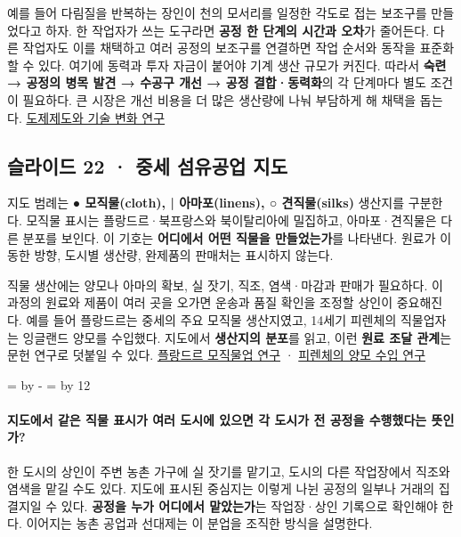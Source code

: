 \documentclass[10pt,a4paper]{article}
\newcommand{\ReserveQuestionSpace}{%
  \par\begingroup
  \dimen0=\pagegoal \advance\dimen0 by -\pagetotal
  \dimen2=\baselineskip \multiply\dimen2 by 12
  \ifdim\dimen0<\dimen2 \newpage\fi
  \endgroup}
\begin{document}
예를 들어 다림질을 반복하는 장인이 천의 모서리를 일정한 각도로 접는 보조구를 만들었다고 하자. 한 작업자가 쓰는 도구라면 \textbf{공정 한 단계의 시간과 오차}가 줄어든다. 다른 작업자도 이를 채택하고 여러 공정의 보조구를 연결하면 작업 순서와 동작을 표준화할 수 있다. 여기에 동력과 투자 자금이 붙어야 기계 생산 규모가 커진다. 따라서 \textbf{숙련 → 공정의 병목 발견 → 수공구 개선 → 공정 결합·동력화}의 각 단계마다 별도 조건이 필요하다. 큰 시장은 개선 비용을 더 많은 생산량에 나눠 부담하게 해 채택을 돕는다. \href{https://www.cambridge.org/core/journals/journal-of-economic-history/article/abs/craft-guilds-apprenticeship-and-technological-change-in-preindustrial-europe/4B18A7808BACBFA40D76475FBCB665E0}{도제제도와 기술 변화 연구}\par

\subsection{슬라이드 22 · 중세 섬유공업 지도}
지도 범례는 \textbf{● 모직물(cloth), | 아마포(linens), ○ 견직물(silks)} 생산지를 구분한다. 모직물 표시는 플랑드르·북프랑스와 북이탈리아에 밀집하고, 아마포·견직물은 다른 분포를 보인다. 이 기호는 \textbf{어디에서 어떤 직물을 만들었는가}를 나타낸다. 원료가 이동한 방향, 도시별 생산량, 완제품의 판매처는 표시하지 않는다.\par

직물 생산에는 양모나 아마의 확보, 실 잣기, 직조, 염색·마감과 판매가 필요하다. 이 과정의 원료와 제품이 여러 곳을 오가면 운송과 품질 확인을 조정할 상인이 중요해진다. 예를 들어 플랑드르는 중세의 주요 모직물 생산지였고, 14세기 피렌체의 직물업자는 잉글랜드 양모를 수입했다. 지도에서 \textbf{생산지의 분포}를 읽고, 이런 \textbf{원료 조달 관계}는 문헌 연구로 덧붙일 수 있다. \href{https://www.cambridge.org/core/journals/urban-history/article/organizing-specialized-production-gender-in-the-medieval-flemish-wool-cloth-industry-c-12501384/A173396BD9F8E10E74634263506620BE}{플랑드르 모직물업 연구} · \href{https://www.cambridge.org/core/journals/business-history-review/article/political-economy-and-the-medici/827737FC0AD5BE1F90FA1AA640B14278}{피렌체의 양모 수입 연구}\par

\ReserveQuestionSpace
\paragraph{지도에서 같은 직물 표시가 여러 도시에 있으면 각 도시가 전 공정을 수행했다는 뜻인가?}
한 도시의 상인이 주변 농촌 가구에 실 잣기를 맡기고, 도시의 다른 작업장에서 직조와 염색을 맡길 수도 있다. 지도에 표시된 중심지는 이렇게 나뉜 공정의 일부나 거래의 집결지일 수 있다. \textbf{공정을 누가 어디에서 맡았는가}는 작업장·상인 기록으로 확인해야 한다. 이어지는 농촌 공업과 선대제는 이 분업을 조직한 방식을 설명한다.\par
\end{document}
